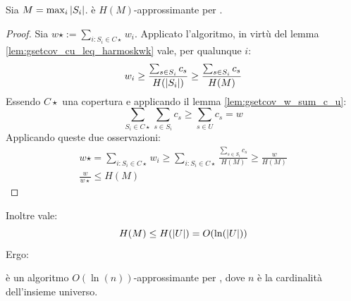 \begin{theorem}
	Sia $M=\max_i| S_i |$. \GreedySetCover è $H(M)$-approssimante per \MinSetCover.
\end{theorem}
\begin{proof}
	Sia $w\star:=\sum_{i:S_i\in C\star} w_i$.
	Applicato l'algoritmo, in virtù del lemma \ref{lem:gsetcov_cu_leq_harmoskwk} vale, per qualunque $i$:
	\begin{equation*}
		w_i\geq\frac{\sum_{s\in S_i} c_s}{H(| S_i |)}\geq\frac{\sum_{s\in S_i} c_s}{H(M)}
	\end{equation*}
	Essendo $C\star$ una copertura e applicando il lemma \ref{lem:gsetcov_w_sum_c_u}:
	\begin{equation*}
		\sum_{S_i\in C\star}\sum_{s\in S_i} c_s \geq \sum_{s\in U} c_s = w
	\end{equation*}
	Applicando queste due osservazioni:
	\begin{gather*}
		w\star = \sum_{i:S_i\in C\star} w_i \geq \sum_{i:S_i\in C\star} \frac{\sum_{s\in S_i} c_s}{H(M)} \geq \frac{w}{H(M)} \\
		\frac{w}{w\star} \leq H(M)
	\end{gather*}
\end{proof}

Inoltre vale:
\begin{equation*}
	H(M)\leq H(| U |) = O(\ln(| U |))
\end{equation*}
Ergo:
\begin{corollario}
	\GreedySetCover è un algoritmo $O(\ln(n))$-approssimante per \MinSetCover, dove $n$ è la cardinalità dell'insieme universo.
\end{corollario}

